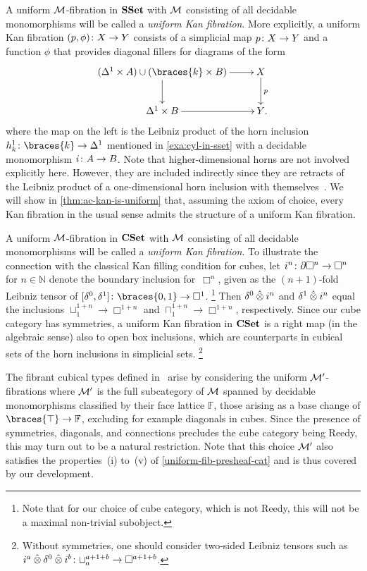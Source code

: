 \documentclass[reqno,10pt,a4paper,oneside,draft]{amsart}
\begin{document}
\begin{example}
A uniform $\cal{M}$-fibration in $\SSet$ with $\cal{M}$ consisting of all decidable monomorphisms will be called a \emph{uniform Kan fibration}.
More explicitly, a uniform Kan fibration $(p, \phi) \co X \to Y$ consists of a simplicial map $p \co X \to Y$ and a function $\phi$ that provides diagonal fillers for diagrams of the form
\[
\xymatrix{
  (\Delta^1 \times A) \cup (\braces{k} \times B)
  \ar[r]
  \ar[d]
&
  X
  \ar[d]^{p}
\\
  \Delta^1 \times B
  \ar[r]
&
  Y
\rlap{.}}
\]
where the map on the left is the Leibniz product of the horn inclusion $h_k^1 \co \braces{k} \to \Delta^1$ mentioned in \cref{exa:cyl-in-sset} with a decidable monomorphism $i \co A \to B$.
Note that higher-dimensional horns are not involved explicitly here.
However, they are included indirectly since they are retracts of the Leibniz product of a one-dimensional horn inclusion with themselves~\cite[Chap.~IV, Sec.~2]{gabriel-zisman:calculus-of-fractions}.
We will show in \cref{thm:ac-kan-is-uniform} that, assuming the axiom of choice, every Kan fibration in the usual sense admits the structure of a uniform Kan fibration.
\end{example}

\begin{example}
A uniform $\cal{M}$-fibration in $\CSet$ with $\cal{M}$ consisting of all decidable monomorphisms will be called a \emph{uniform Kan fibration}.
To illustrate the connection with the classical Kan filling condition for cubes, let $i^n \co \partial \Box^n \to \Box^n$ for $n \in \mathbb{N}$ denote the boundary inclusion for~$\Box^n$, given as the $(n+1)$-fold Leibniz tensor of $[\lcyl, \rcyl] \co \braces{0, 1} \to \Box^1$.%
\footnote{Note that for our choice of cube category, which is not Reedy, this will not be a maximal non-trivial subobject.}
Then $\lcyl \hatotimes i^n$ and $\rcyl \hatotimes i^n$ equal the inclusions $\sqcup_1^{1+n} \to \Box^{1+n}$ and $\sqcap_1^{1+n} \to \Box^{1+n}$, respectively.
Since our cube category has symmetries, a uniform Kan fibration in $\CSet$ is a right map (in the algebraic sense) also to open box inclusions, which are
counterparts in cubical sets of the horn inclusions in simplicial sets.%
\footnote{Without symmetries, one should consider two-sided Leibniz tensors such as $i^a \hatotimes \lcyl \hatotimes i^b \co \sqcup_a^{a+1+b} \to \Box^{a+1+b}$.}

The fibrant cubical types defined in~\cite{cohen-et-al:cubicaltt} arise by considering the uniform $\cal{M}'$-fibrations where $\cal{M}'$ is the full subcategory of $\cal{M}$ spanned by decidable monomorphisms classified by their face lattice $\mathbb{F}$, \ie those arising as a base change of $\braces{\top} \to \mathbb{F}$, excluding for example diagonals in cubes.
Since the presence of symmetries, diagonals, and connections precludes the cube category being Reedy, this may turn out to be a natural restriction.
Note that this choice $\cal{M}'$ also satisfies the properties~(i) to~(v) of \cref{uniform-fib-presheaf-cat} and is thus covered by our development.
\end{example}
\end{document}
